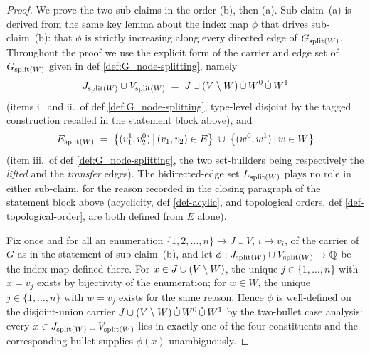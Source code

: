 \documentclass[main]{subfiles}
\begin{document}
\begin{proof}
%

We prove the two sub-claims in the order (b), then (a). Sub-claim~(a) is derived from the same key lemma about the index map $\phi$ that drives sub-claim~(b): that $\phi$ is strictly increasing along every directed edge of $G_{\mathrm{split}(W)}$. Throughout the proof we use the explicit form of the carrier and edge set of $G_{\mathrm{split}(W)}$ given in def \ref{def:G_node-splitting}, namely
\[
    J_{\mathrm{split}(W)} \cup V_{\mathrm{split}(W)} \;=\; J \cup (V \setminus W) \,\dot{\cup}\, W^0 \,\dot{\cup}\, W^1
\]
(items i.\ and ii.\ of def \ref{def:G_node-splitting}, type-level disjoint by the tagged construction recalled in the statement block above), and
\[
    E_{\mathrm{split}(W)} \;=\; \left \{ (v_1^1, v_2^0) \,\middle|\, (v_1, v_2) \in E \right \} \;\cup\; \left \{ (w^0, w^1) \,\middle|\, w \in W \right \}
\]
(item iii.\ of def \ref{def:G_node-splitting}, the two set-builders being respectively the \emph{lifted} and the \emph{transfer} edges). The bidirected-edge set $L_{\mathrm{split}(W)}$ plays no role in either sub-claim, for the reason recorded in the closing paragraph of the statement block above (acyclicity, def \ref{def-acylic}, and topological orders, def \ref{def-topological-order}, are both defined from $E$ alone).

Fix once and for all an enumeration $\{1, 2, \dots, n\} \to J \cup V$, $i \mapsto v_i$, of the carrier of $G$ as in the statement of sub-claim~(b), and let $\phi : J_{\mathrm{split}(W)} \cup V_{\mathrm{split}(W)} \to \mathbb{Q}$ be the index map defined there. For $x \in J \cup (V \setminus W)$, the unique $j \in \{1, \dots, n\}$ with $x = v_j$ exists by bijectivity of the enumeration; for $w \in W$, the unique $j \in \{1, \dots, n\}$ with $w = v_j$ exists for the same reason. Hence $\phi$ is well-defined on the disjoint-union carrier $J \cup (V \setminus W) \,\dot{\cup}\, W^0 \,\dot{\cup}\, W^1$ by the two-bullet case analysis: every $x \in J_{\mathrm{split}(W)} \cup V_{\mathrm{split}(W)}$ lies in exactly one of the four constituents and the corresponding bullet supplies $\phi(x)$ unambiguously.


\end{proof}
\end{document}
